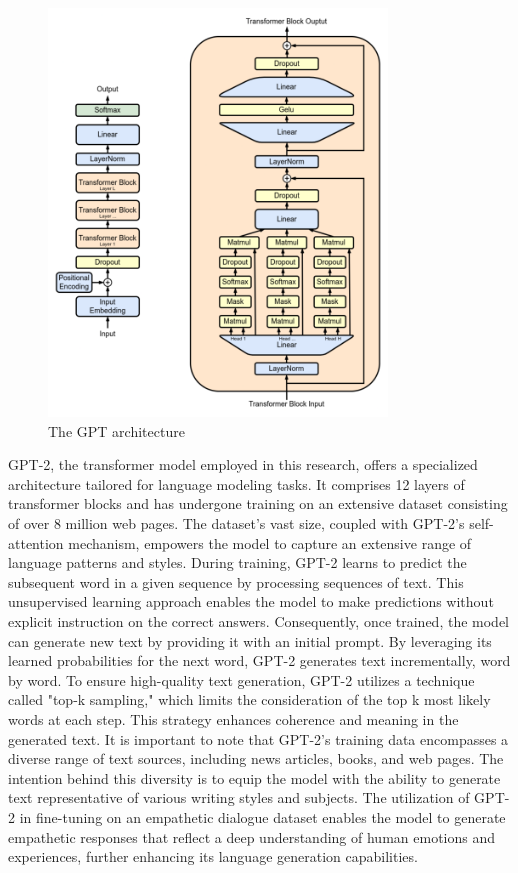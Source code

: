 \documentclass[12pt]{IEEEtran}
\begin{document}
\begin{figure}[htp]
  \centering
  \includegraphics[width=9cm]{1.png}
  \caption{The GPT architecture}\label{figuregpt-2model}
\end{figure}
GPT-2, the transformer model employed in this research, offers a specialized architecture tailored for language modeling tasks. It comprises 12 layers of transformer blocks and has undergone training on an extensive dataset consisting of over 8 million web pages. The dataset's vast size, coupled with GPT-2's self-attention mechanism, empowers the model to capture an extensive range of language patterns and styles. During training, GPT-2 learns to predict the subsequent word in a given sequence by processing sequences of text. This unsupervised learning approach enables the model to make predictions without explicit instruction on the correct answers. Consequently, once trained, the model can generate new text by providing it with an initial prompt. By leveraging its learned probabilities for the next word, GPT-2 generates text incrementally, word by word. To ensure high-quality text generation, GPT-2 utilizes a technique called "top-k sampling," which limits the consideration of the top k most likely words at each step. This strategy enhances coherence and meaning in the generated text. It is important to note that GPT-2's training data encompasses a diverse range of text sources, including news articles, books, and web pages. The intention behind this diversity is to equip the model with the ability to generate text representative of various writing styles and subjects. The utilization of GPT-2 in fine-tuning on an empathetic dialogue dataset enables the model to generate empathetic responses that reflect a deep understanding of human emotions and experiences, further enhancing its language generation capabilities.
\end{document}

